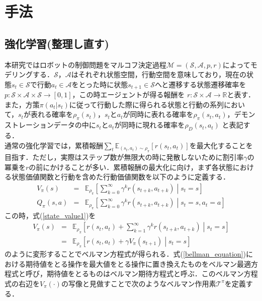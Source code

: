 \documentclass[dvipdfmx]{ampbt_nomag}
\begin{document}
\section{手法}\label{sec-method}
\subsection{強化学習(整理し直す)}
本研究ではロボットの制御問題をマルコフ決定過程$\mathcal{M} = (\mathcal{S},\mathcal{A},p,r)$によってモデリングする．$\mathcal{S}$，$\mathcal{A}$はそれぞれ状態空間，行動空間を意味しており，現在の状態$s_t \in \mathcal{S}$で行動$a_t \in \mathcal{A}$をとった時に状態$s_{t+1}\in\mathcal{S}$へと遷移する状態遷移確率を$ p:\mathcal{S}\times\mathcal{A}\times\mathcal{S}\rightarrow[0,1]$，この時エージェントが得る報酬を $r:\mathcal{S}\times\mathcal{A}\rightarrow\mathbb{R}$と表す．また，方策$\pi(a_t|s_t)$に従って行動した際に得られる状態と行動の系列において，$s_t$が表れる確率を$\rho_\pi(s_t)$，$s_t$と$a_t$が同時に表れる確率を$\rho_\pi(s_t,a_t)$，デモンストレーションデータの中に$s_t$と$a_t$が同時に現れる確率を$\rho_D(s_t,a_t)$ と表記する．\\
通常の強化学習では，累積報酬$\sum_t \mathbb{E}_{(s_t,a_t)\sim\rho_\pi}[r(s_t, a_t)]$を最大化することを目指す．ただし，実際はステップ数が無限大の時に発散しないために割引率$\gamma$の冪乗を$r$の前にかけることが多い．累積報酬の最大化に向け，まず各状態における状態価値関数と行動を含めた行動価値関数を以下のように定義する．
\begin{eqnarray} \label{state_value1}
  V_\pi(s) &=& \mathbb{E}_{\rho_\pi} \left[\sum^{\infty}_{k=0}\gamma^kr(s_{t+k},a_{t+k}) \middle|s_t = s\right] \\
  \label{state_value2}
  Q_\pi(s,a) &=& \mathbb{E}_{\rho_\pi} \left[\sum^{\infty}_{k=0}\gamma^kr(s_{t+k},a_{t+k}) \middle|s_t = s, a_t = a \right]
\end{eqnarray}
この時，式(\ref{state_value1})を
\begin{eqnarray} \label{bellman_equation}
  V_\pi(s) &=& \mathbb{E}_{\rho_\pi} \left[ r(s_t,a_t) + \sum^{\infty}_{k=1} \gamma^{k}r(s_{t+k},a_{t+k}) \middle|s_t = s\right] \\ \nonumber
  &=& \mathbb{E}_{\rho_\pi} \left[ r(s_t,a_t) + \gamma V_\pi(s_{t+1}) \middle|s_t = s\right]
\end{eqnarray}
のように変形することでベルマン方程式が得られる．式(\ref{bellman_equation})における期待値をとる操作を最大値をとる操作に置き換えたものをベルマン最適方程式と呼び，期待値をとるものはベルマン期待方程式と呼ぶ．このベルマン方程式の右辺を$V_\pi(\cdot)$の写像と見做すことで次のようなベルマン作用素$\mathcal{T}^\pi$を定義する．
\end{document}
